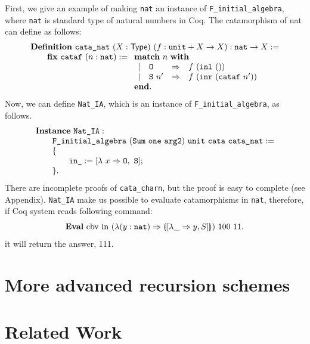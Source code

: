 \documentclass[runningheads, orivec]{llncs}
\begin{document}
First, we give an example of making \verb~nat~ an instance of \verb~F_initial_algebra~, where \verb~nat~ is standard type of natural numbers in Coq. The catamorphism of nat can define as follows:
\[
\begin{array}{l}
\mathbf{Definition}~\verb~cata_nat~~(X : \mathsf{Type})~(f : \verb~unit~ + X \to X) : \verb~nat~ \to X :=\\
\qquad \mathbf{fix}~\verb~cataf~~(n : \verb~nat~) := \begin{array}[t]{l}
       \mathbf{match}~n~\mathbf{with}\\
       \begin{array}{llll}
       | & \verb~O~    &\Rightarrow& f ~ (\verb~inl~ ~ ()) \\
       | & \verb~S~ ~ n' &\Rightarrow& f ~ (\verb~inr~ ~ (\verb~cataf~ ~ n')) 
       \end{array}\\
       \mathbf{end}.
       \end{array}
\end{array}
\]
Now, we can define \verb~Nat_IA~, which is an instance of \verb~F_initial_algebra~, as follows.
\[
\begin{array}{l}
\mathbf{Instance}~\verb~Nat_IA~ : \\
\qquad \verb~F_initial_algebra~~(\verb~Sum~~\verb~one~~\verb~arg2~)~\verb~unit~~\verb~cata~~\verb~cata_nat~ :=\\
\qquad \{\\
\qquad \qquad \verb~in_~ := [\lambda ~ x \Rightarrow \verb~O~, ~ \verb~S~];\\
\qquad \}.\\
\end{array}
\]
There are incomplete proofs of \verb~cata_charn~, but the proof is easy to complete (see Appendix). \verb~Nat_IA~ make us possible to evaluate catamorphisms in \verb~nat~, therefore, if Coq system reads following command: 
\[
\mathbf{Eval}~\mathrm{cbv}~\mathrm{in}~ (\lambda (y : \verb~nat~) \Rightarrow \llparenthesis [ \lambda \_ \Rightarrow y, S ] \rrparenthesis) ~ 100 ~ 11.
\]
it will return the answer, 111.

\section{More advanced recursion schemes}




\section{Related Work}
\end{document}
